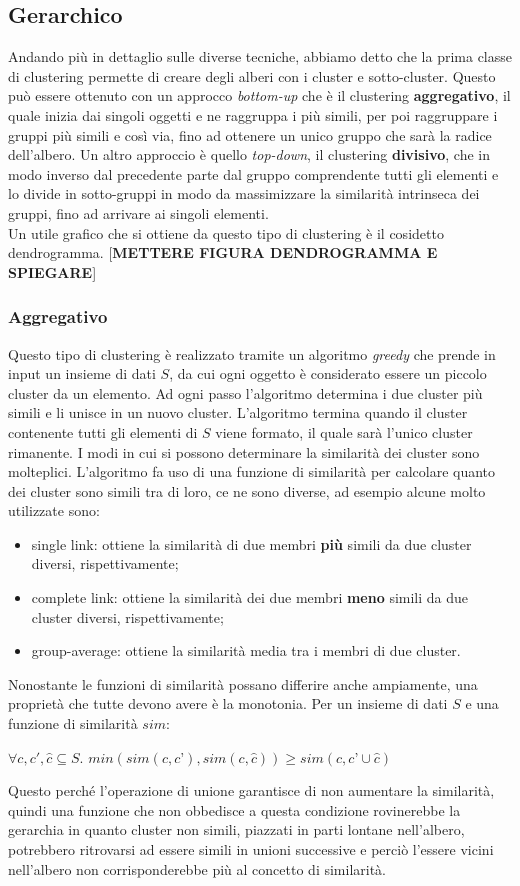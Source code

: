 \documentclass{llncs}
\newcommand{\acapo}{\vspace{0.5\baselineskip}\\}
\begin{document}
	\subsection{Gerarchico}
	Andando più in dettaglio sulle diverse tecniche, abbiamo detto che la prima classe di clustering permette di creare degli alberi con i cluster e sotto-cluster. 
	Questo può essere ottenuto con un approcco \textit{bottom-up} che è il clustering \textbf{aggregativo},
	il quale inizia dai singoli oggetti e ne raggruppa i più simili, per poi raggruppare i gruppi più simili e così via, fino ad ottenere un unico gruppo
	che sarà la radice dell'albero. Un altro approccio è quello \textit{top-down}, il clustering \textbf{divisivo}, che in modo inverso dal precedente parte 
	dal gruppo comprendente tutti gli elementi e lo divide in sotto-gruppi in modo da massimizzare la similarità intrinseca dei gruppi, 
	fino ad arrivare ai singoli elementi.
	\acapo
	Un utile grafico che si ottiene da questo tipo di clustering è il cosidetto dendrogramma. 
	[\textbf{METTERE FIGURA DENDROGRAMMA E SPIEGARE}]

	\subsubsection{Aggregativo}
	Questo tipo di clustering è realizzato tramite un algoritmo \textit{greedy} che prende in input un insieme di dati $S$, da cui ogni oggetto è considerato essere un piccolo cluster da un elemento.
	Ad ogni passo l'algoritmo determina i due cluster più simili e li unisce in un nuovo cluster. L'algoritmo termina
	quando il cluster contenente tutti gli elementi di $S$ viene formato, il quale sarà l'unico cluster rimanente.
	I modi in cui si possono determinare la similarità dei cluster sono molteplici. L'algoritmo fa uso di una funzione di similarità per calcolare quanto dei cluster sono simili tra di loro, ce ne sono
	diverse, ad esempio alcune molto utilizzate sono:
	\begin{itemize}
		\item single link: ottiene la similarità di due membri \textbf{più} simili da due cluster diversi, rispettivamente;
		\item complete link: ottiene la similarità dei due membri \textbf{meno} simili da due cluster diversi, rispettivamente;
		\item group-average: ottiene la similarità media tra i membri di due cluster.
	\end{itemize}
	Nonostante le funzioni di similarità possano differire anche ampiamente, una proprietà che tutte devono avere è la monotonia. Per un insieme di dati $S$ e una funzione di similarità $sim$:
	\begin{center}
		$\forall c, c', \hat{c} \subseteq S$. $min(sim(c, c’), sim(c, \hat{c})) \ge sim(c, c’ \cup \hat{c})$
	\end{center}
	Questo perché l'operazione di unione garantisce	di non aumentare la similarità, quindi una funzione che non obbedisce a questa condizione
	rovinerebbe la gerarchia in quanto cluster non simili, piazzati in parti lontane nell'albero, potrebbero
	ritrovarsi ad essere simili in unioni successive e perciò l'essere vicini nell'albero non corrisponderebbe più al concetto di similarità.
	
\end{document}
